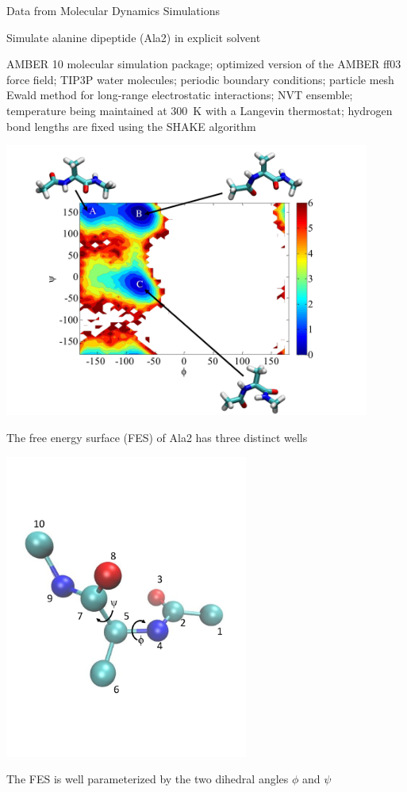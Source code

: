 \documentclass[12pt]{beamer}
\begin{document}
\begin{frame}{Data from Molecular Dynamics Simulations}

	Simulate alanine dipeptide (Ala2) in explicit solvent \\
	{\tiny AMBER 10 molecular simulation package;
    optimized version of the AMBER ff03 force field;
    TIP3P water molecules;
    periodic boundary conditions;
    particle mesh Ewald method for long-range electrostatic interactions;
    NVT ensemble;
    temperature being maintained at 300~K with a Langevin thermostat;
    hydrogen bond lengths are fixed using the SHAKE algorithm \par}
    
    \begin{minipage}[b]{0.5\textwidth}
        \centering
        \includegraphics[width=0.9\textwidth]{FES}\\
        {\footnotesize The free energy surface (FES) of Ala2 has three distinct wells \par}
    \end{minipage}
    \hfill
    \begin{minipage}[b]{0.4\textwidth}
        \centering
        \includegraphics[width=0.6\textwidth]{molecule2}\\
        {\footnotesize The FES is well parameterized by the two dihedral angles $\phi$ and $\psi$ \par}
    \end{minipage}


\end{frame}
\end{document}
